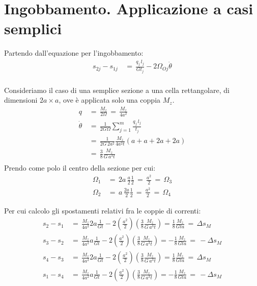\section{Ingobbamento. Applicazione a casi semplici}

Partendo dall'equazione per l'ingobbamento:
\begin{align*}
     s_{2j}-s_{1j} \,&=\,\frac{q_j\,l_j}{Gt_j}- 2\Omega_{Oj}\dot{\theta}\\
\end{align*}

\begin{esempioBox}
    Consideriamo il caso di una semplice sezione a una cella rettangolare, di dimensioni $2a\times a$, ove è applicata solo una coppia $M_z$.
\begin{align*}
    q\,&=\, \frac{M_z}{2\Omega}\,=\,\frac{M_z}{4a^2}\\
     \dot{\theta}  \,&=\,\frac{1}{2G\Omega}\sum^m_{j=1}\frac{q_j\,l_j}{t_j}\\
     &=\,\frac{1}{2G\,2a^2}\frac{M_z}{4a^2t}(a+a+2a+2a)\\
     &=\,\frac{3}{8}\frac{M_z}{G\,a^3t}\\
\end{align*}
Prendo come polo il centro della sezione per cui:
\begin{align*}
    \Omega_1\,&=\,2a\,\frac{a}{2}\frac{1}{2}\,=\,\frac{a^2}{2}\,=\,\Omega_3\\
     \Omega_2\,&=\,a\,\frac{2a}{2}\frac{1}{2}\,=\,\frac{a^2}{2}\,=\,\Omega_4
\end{align*}

Per cui calcolo gli spostamenti relativi fra le coppie di correnti:
\begin{align*}
     s_{2}-s_{1} \,&=\,\frac{M_z}{4a^2}2a\frac{1}{Gt}-2\left( \frac{a^2}{2} \right) \left(   \frac{3}{8}\frac{M_z}{G\,a^3t}\right)
     = \frac{1}{8}\frac{M_z}{Gta} \,=\,\Delta s_M\\
      s_{3}-s_{2} \,&=\,\frac{M_z}{4a^2}a\frac{1}{Gt}-2\left( \frac{a^2}{2} \right) \left(   \frac{3}{8}\frac{M_z}{G\,a^3t}\right)
     = -\frac{1}{8}\frac{M_z}{Gta} \,=\,-\Delta s_M\\
      s_{4}-s_{3} \,&=\,\frac{M_z}{4a^2}2a\frac{1}{Gt}-2\left( \frac{a^2}{2} \right) \left(   \frac{3}{8}\frac{M_z}{G\,a^3t}\right)
     = \frac{1}{8}\frac{M_z}{Gta} \,=\,\Delta s_M\\
      s_{1}-s_{4} \,&=\,\frac{M_z}{4a^2}a\frac{1}{Gt}-2\left( \frac{a^2}{2} \right) \left(   \frac{3}{8}\frac{M_z}{G\,a^3t}\right)
     =- \frac{1}{8}\frac{M_z}{Gta} \,=\,-\Delta s_M\\
\end{align*}


\end{esempioBox}
